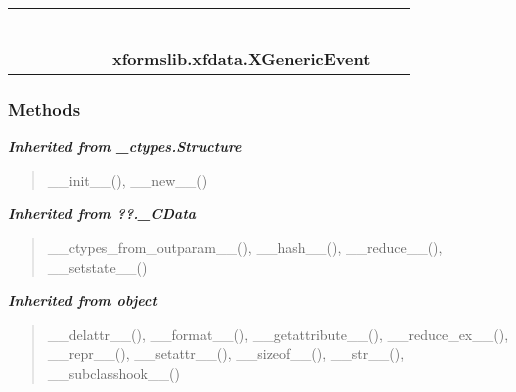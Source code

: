     \label{xformslib:xfdata:XGenericEvent}
\begin{tabular}{cccccccccc}
\multicolumn{2}{r}{\settowidth{\BCL}{object}\multirow{2}{\BCL}{object}}
&&
&&
&&
  \\\cline{3-3}
  &&\multicolumn{1}{c|}{}
&&
&&
&&
  \\
\multicolumn{4}{r}{\settowidth{\BCL}{??.\_CData}\multirow{2}{\BCL}{??.\_CData}}
&&
&&
  \\\cline{5-5}
  &&&&\multicolumn{1}{c|}{}
&&
&&
  \\
\multicolumn{6}{r}{\settowidth{\BCL}{\_ctypes.Structure}\multirow{2}{\BCL}{\_ctypes.Structure}}
&&
  \\\cline{7-7}
  &&&&&&\multicolumn{1}{c|}{}
&&
  \\
&&&&&&\multicolumn{2}{l}{\textbf{xformslib.xfdata.XGenericEvent}}
\end{tabular}



  \subsubsection{Methods}


\large{\textbf{\textit{Inherited from \_ctypes.Structure}}}

\begin{quote}
\_\_init\_\_(), \_\_new\_\_()
\end{quote}

\large{\textbf{\textit{Inherited from ??.\_CData}}}

\begin{quote}
\_\_ctypes\_from\_outparam\_\_(), \_\_hash\_\_(), \_\_reduce\_\_(), \_\_setstate\_\_()
\end{quote}

\large{\textbf{\textit{Inherited from object}}}

\begin{quote}
\_\_delattr\_\_(), \_\_format\_\_(), \_\_getattribute\_\_(), \_\_reduce\_ex\_\_(), \_\_repr\_\_(), \_\_setattr\_\_(), \_\_sizeof\_\_(), \_\_str\_\_(), \_\_subclasshook\_\_()
\end{quote}

